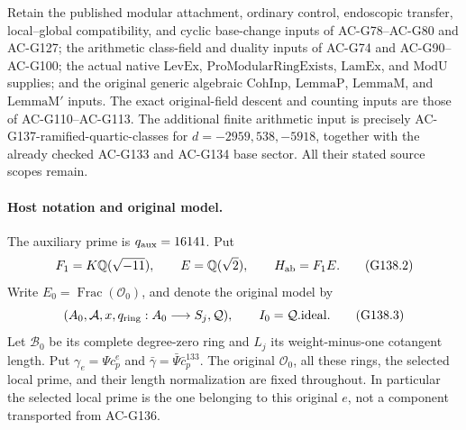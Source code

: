 Retain the published modular attachment, ordinary control,
endoscopic transfer, local--global compatibility, and cyclic
base-change inputs of AC-G78--AC-G80 and AC-G127; the arithmetic
class-field and duality inputs of AC-G74 and AC-G90--AC-G100;
the actual native \(\mathrm{LevEx}\),
\(\mathrm{ProModularRingExists}\), \(\mathrm{LamEx}\), and
\(\mathrm{ModU}\) supplies; and the original generic algebraic
\(\mathrm{CohInp}\), \(\mathrm{LemmaP}\),
\(\mathrm{LemmaM}\), and \(\mathrm{LemmaM'}\) inputs.
The exact original-field descent and counting inputs are those
of AC-G110--AC-G113.  The additional finite arithmetic input
is precisely AC-G137-ramified-quartic-classes for
\(d=-2959,538,-5918\), together with the already checked AC-G133
and AC-G134 base sector.  All their stated source scopes remain.

\paragraph{Host notation and original model.}
The auxiliary prime is \(q_{\rm aux}=16141\).  Put
\[
 F_1=K\mathbb Q(\sqrt{-11}),\qquad
 E=\mathbb Q(\sqrt2),\qquad
 H_{\rm ab}=F_1E.
 \tag{G138.2}
\]
Write \(E_0=\operatorname{Frac}(\mathcal O_0)\), and denote the
original model by
\[
 (A_0,\mathcal A,x,q_{\rm ring}:A_0\longrightarrow S_j,\mathcal Q),
 \qquad I_0=\mathcal Q.\mathrm{ideal}.
 \tag{G138.3}
\]
Let \(\mathscr B_0\) be its complete degree-zero ring and \(L_j\)
its weight-minus-one cotangent length.  Put
\(\gamma_e=\Psi c_p^e\) and
\(\bar\gamma=\bar\Psi\bar c_p^{133}\).
The original \(\mathcal O_0\), all these rings, the selected
local prime, and their length normalization are fixed throughout.
In particular the selected local prime is the one belonging to
this original \(e\), not a component transported from AC-G136.

